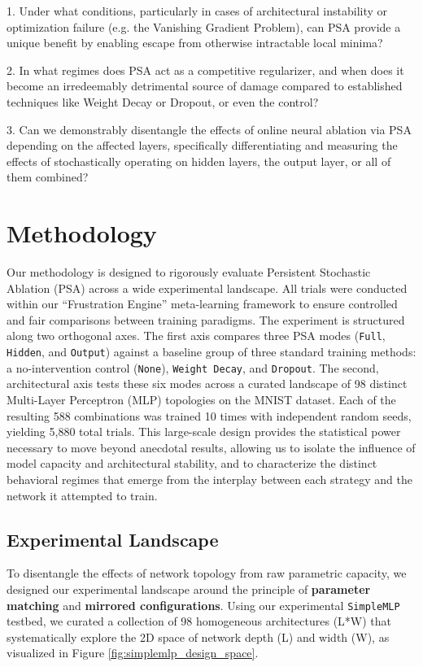 \documentclass[conference]{IEEEtran}
\begin{document}
1. Under what conditions, particularly in cases of architectural instability or optimization failure (e.g. the Vanishing Gradient Problem\cite{b5}), can PSA provide a unique benefit by enabling escape from otherwise intractable local minima?

2. In what regimes does PSA act as a competitive regularizer, and when does it become an irredeemably detrimental source of damage compared to established techniques like Weight Decay or Dropout, or even the control?

3. Can we demonstrably disentangle the effects of online neural ablation via PSA depending on the affected layers, specifically differentiating and measuring the effects of stochastically operating on hidden layers, the output layer, or all of them combined?

\section{Methodology}

Our methodology is designed to rigorously evaluate Persistent Stochastic Ablation (PSA) across a wide experimental landscape. All trials were conducted within our ``Frustration Engine'' meta-learning framework to ensure controlled and fair comparisons between training paradigms. The experiment is structured along two orthogonal axes. The first axis compares three PSA modes (\verb|Full|, \verb|Hidden|, and \verb|Output|) against a baseline group of three standard training methods: a no-intervention control (\verb|None|), \verb|Weight Decay|, and \verb|Dropout|. The second, architectural axis tests these six modes across a curated landscape of 98 distinct Multi-Layer Perceptron (MLP) topologies on the MNIST dataset. Each of the resulting 588 combinations was trained 10 times with independent random seeds, yielding 5,880 total trials. This large-scale design provides the statistical power necessary to move beyond anecdotal results, allowing us to isolate the influence of model capacity and architectural stability, and to characterize the distinct behavioral regimes that emerge from the interplay between each strategy and the network it attempted to train.

\subsection{Experimental Landscape}

To disentangle the effects of network topology from raw parametric capacity, we designed our experimental landscape around the principle of \textbf{parameter matching} and \textbf{mirrored configurations}. Using our experimental \verb|SimpleMLP| testbed, we curated a collection of 98 homogeneous architectures (L*W) that systematically explore the 2D space of network depth (L) and width (W), as visualized in Figure \ref{fig:simplemlp_design_space}.
\end{document}
